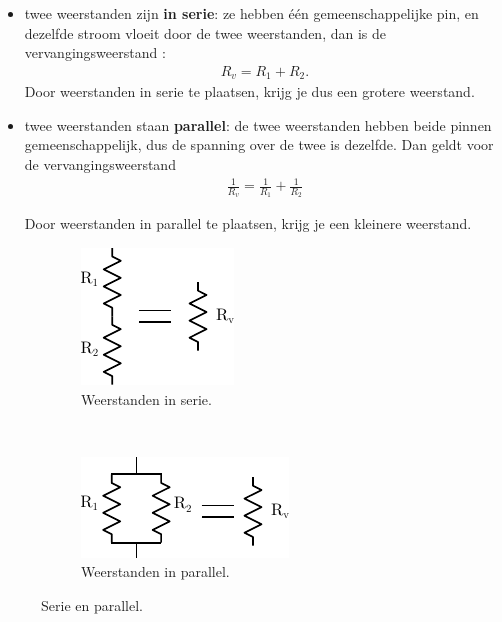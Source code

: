 \documentclass{article}
\begin{document}
			\begin{itemize}
				\item twee weerstanden zijn \textbf{in serie}: ze hebben \'e\'en gemeenschappelijke pin, en dezelfde stroom vloeit door de twee weerstanden, dan is de vervangingsweerstand :
				\begin{align}
					R_{v} = R_1 + R_2.
				\end{align}
				Door weerstanden in serie te plaatsen, krijg je dus een grotere weerstand.

				\item twee weerstanden staan \textbf{parallel}: de twee weerstanden hebben beide pinnen gemeenschappelijk, dus de spanning over de twee is dezelfde. Dan geldt voor de vervangingsweerstand 
				\begin{align}
					\frac{1}{R_{v}}= \frac{1}{R_{1}} + \frac{1}{R_{2}} 
				\end{align}

				Door weerstanden in parallel te plaatsen, krijg je een kleinere weerstand.
			\end{itemize}

			\begin{figure}[hbtp]
				\centering
				\begin{subfigure}[b]{0.45\linewidth}
					\centering
					\includegraphics[width=0.5\linewidth]{serie}
					\caption{Weerstanden in serie.}
					\label{subfig:serie}
				\end{subfigure}
				~
				\begin{subfigure}[b]{0.45\linewidth}
					\centering
					\includegraphics[width=0.8\linewidth]{parallel}
					\caption{Weerstanden in parallel.}
					\label{subfig:parallel}
				\end{subfigure}
				\caption{Serie en parallel.}
				\label{fig:serie_en_parallel}
			\end{figure}
\end{document}
